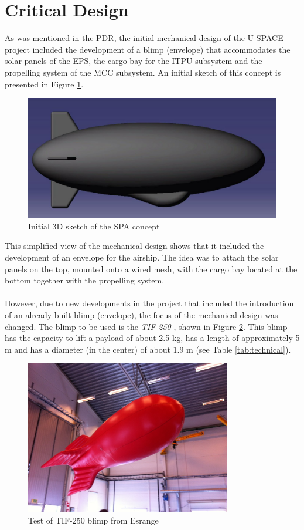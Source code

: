\section{Critical Design}
%
As was mentioned in the \ac{PDR}, the initial mechanical design of the \ac{U-SPACE} project included the development of a blimp (envelope) that accommodates the solar panels of the \ac{EPS}, the cargo bay for the \ac{ITPU} subsystem and the propelling system of the \ac{MCC} subsystem. An initial sketch of this concept is presented in Figure \ref{fig:init}. 
%
%
\begin{figure}[H]
\centering
\includegraphics[scale=0.5]{figures/init.png}
\caption{Initial 3D sketch of the SPA concept}
\label{fig:init}
\end{figure}
%
\noindent
This simplified view of the mechanical design shows that it included the development of an envelope for the airship. The idea was to attach the solar panels on the top, mounted onto a wired mesh, with the cargo bay located at the bottom together with the propelling system.
\\
\\
However, due to new developments in the project that included the introduction of an already built blimp (envelope), the focus of the mechanical design was changed. The blimp to be used is the \textit{TIF-250} \cite{website:tif250}, shown in Figure \ref{fig:blimp}. This blimp has the capacity to lift a payload of about 2.5 kg, has a length of approximately 5 m and has a diameter (in the center) of about 1.9 m (see Table \ref{tab:technical}).
%
%
\begin{figure}[H]
\centering
\includegraphics[width=0.8\textwidth]{figures/blimp.jpg}
\caption{Test of TIF-250 blimp from Esrange}
\label{fig:blimp}
\end{figure}
